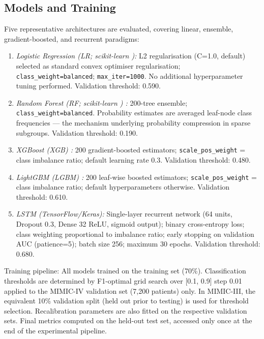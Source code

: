 \documentclass{ieeeaccess}
\begin{document}
\subsection{Models and Training}

Five representative architectures are evaluated, covering linear, ensemble, gradient-boosted, and recurrent paradigms:

\begin{enumerate}
  \item \textit{Logistic Regression (LR; scikit-learn \cite{b34}):} L2 regularisation (C=1.0, default) selected as standard convex optimiser regularisation; \texttt{class\_weight=balanced}; \texttt{max\_iter=1000}. No additional hyperparameter tuning performed. Validation threshold: 0.590.

  \item \textit{Random Forest (RF; scikit-learn \cite{b34}) \cite{b27}:} 200-tree ensemble; \texttt{class\_weight=balanced}. Probability estimates are averaged leaf-node class frequencies — the mechanism underlying probability compression in sparse subgroups. Validation threshold: 0.190.

  \item \textit{XGBoost (XGB) \cite{b24}:} 200 gradient-boosted estimators; \texttt{scale\_pos\_weight} = class imbalance ratio; default learning rate 0.3. Validation threshold: 0.480.

  \item \textit{LightGBM (LGBM) \cite{b25}:} 200 leaf-wise boosted estimators; \texttt{scale\_pos\_weight} = class imbalance ratio; default hyperparameters otherwise. Validation threshold: 0.610.

  \item \textit{LSTM (TensorFlow/Keras):} Single-layer recurrent network (64 units, Dropout 0.3, Dense 32 ReLU, sigmoid output); binary cross-entropy loss; class weighting proportional to imbalance ratio; early stopping on validation AUC (patience=5); batch size 256; maximum 30 epochs. Validation threshold: 0.680.
\end{enumerate}

Training pipeline: All models trained on the training set (70\%). Classification thresholds are determined by F1-optimal grid search over [0.1, 0.9] step 0.01 applied to the MIMIC-IV validation set (7,200 patients) only. In MIMIC-III, the equivalent 10\% validation split (held out prior to testing) is used for threshold selection. Recalibration parameters are also fitted on the respective validation sets. Final metrics computed on the held-out test set, accessed only once at the end of the experimental pipeline.
\end{document}
